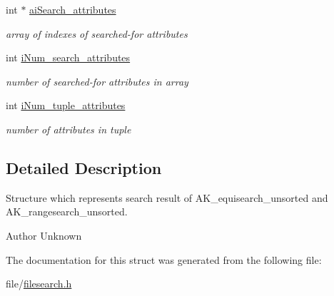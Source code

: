 \begin{DoxyCompactItemize}
int $\ast$ \hyperlink{structsearch__result_a7017e2fb19d50df97aad9224f8cba682}{ai\+Search\+\_\+attributes}
\begin{DoxyCompactList}\small\item\em array of indexes of searched-\/for attributes \end{DoxyCompactList}\item 
\mbox{\label{structsearch__result_a5c9f6447daff5cb8aa7183d71eeffb4a}} 
int \hyperlink{structsearch__result_a5c9f6447daff5cb8aa7183d71eeffb4a}{i\+Num\+\_\+search\+\_\+attributes}
\begin{DoxyCompactList}\small\item\em number of searched-\/for attributes in array \end{DoxyCompactList}\item 
\mbox{\label{structsearch__result_ad5720e57b8309e3922f05dc48cd0dc47}} 
int \hyperlink{structsearch__result_ad5720e57b8309e3922f05dc48cd0dc47}{i\+Num\+\_\+tuple\+\_\+attributes}
\begin{DoxyCompactList}\small\item\em number of attributes in tuple \end{DoxyCompactList}\end{DoxyCompactItemize}


\subsection{Detailed Description}
Structure which represents search result of A\+K\+\_\+equisearch\+\_\+unsorted and A\+K\+\_\+rangesearch\+\_\+unsorted. 

\begin{DoxyAuthor}{Author}
Unknown 
\end{DoxyAuthor}


The documentation for this struct was generated from the following file\+:\begin{DoxyCompactItemize}
\item 
file/\hyperlink{filesearch_8h}{filesearch.\+h}\end{DoxyCompactItemize}
